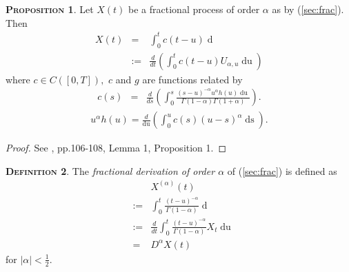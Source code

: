 \documentclass[a4paper, twoside, 11pt]{article}
\theoremstyle{definition}
\newtheorem{definition}{\scshape Definition}[section]
\newtheorem{proposition}[definition]{\scshape Proposition}
\newcommand{\brkt}[1]{\left({#1} \right)}
\begin{document}
\begin{proposition}
  Let $X(t)$ be a fractional process of order $\alpha$ as by (\ref{sec:frac}). Then
  \begin{eqnarray}
	X(t) &=& \int_0^t c(t-u)\mathop{dU_{\alpha, u}}\\
	&:=& \frac{d}{dt}\brkt{\int_0^t c(t-u) U_{\alpha, u} \mathop{du}}
	\label{sec:bb1}
  \end{eqnarray}
  where $c \in C([0, T]),$ $c$ and $g$ are functions related by
  \begin{eqnarray}
	c(s) &=& \frac{d}{ds}\brkt{\int_0^s \frac{(s-u)^{-\alpha}u^\alpha h(u) \mathop{du}}{\Gamma(1-\alpha)\Gamma(1+\alpha)}}.
\label{sec:frac2}
  \end{eqnarray}
  \begin{eqnarray}
	u^\alpha h(u) = \frac{d}{\mathop{du}}\brkt{\int_0^u c(s) (u-s)^\alpha \mathop{ds}}.
	\label{sec:frac3}
  \end{eqnarray}
\end{proposition}

\begin{proof}
  See \cite{core}, pp.106-108, Lemma 1, Proposition 1. 
\end{proof}
\begin{definition}
  The \emph{fractional derivation of order $\alpha$} of (\ref{sec:frac}) is defined as
  \begin{eqnarray}
   && X^{(\alpha)}(t)\nonumber\\
	&:=&  \int_0^t \frac{(t-u)^{-\alpha}}{\Gamma(1-\alpha)} \mathop{dX_{t}}\nonumber\\
    &:=&  \frac{d}{dt}\int_0^t \frac{(t-u)^{-\alpha}}{\Gamma(1-\alpha)} X_{t} \mathop{du} \nonumber\\
	&=& D^{\alpha} X(t)
	\label{sec:cc4}
  \end{eqnarray}
  for $|\alpha| < \frac{1}{2}$.
\end{definition}
\end{document}
